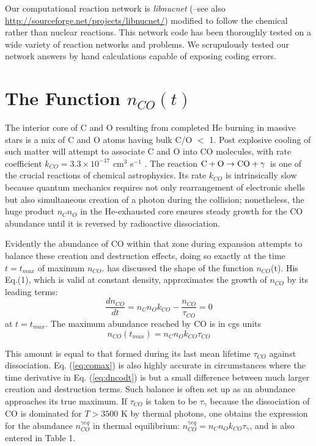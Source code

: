 \documentclass[manuscript]{aastex}
\newcommand{\cotoco}{${\rm C} + {\rm O} \to {\rm CO} + \gamma$}
\begin{document}
Our computational reaction network is {\em libnucnet}
(\citealp{2007M&PSA..42.5215M}--see also
\url{http://sourceforge.net/projects/libnucnet/}) modified to follow
the chemical rather than nuclear reactions.
This network code has been thoroughly tested
on a wide variety of reaction networks and problems.
We scrupulously tested our network answers by hand calculations capable of
exposing coding errors.

\section{The Function $n_{CO}(t)$}

The interior core of C and O resulting from completed He burning in massive
stars is a mix of C and O atoms having bulk C/O $<$ 1. Post explosive cooling of
such matter will attempt to associate C and O into CO molecules, with rate
coefficient $k_{CO} = 3.3 \times 10^{-17}$ cm$^3$ s$^{-1}$
\citep{1990ApJ...358..262L}.
The reaction \cotoco\ is one of the crucial reactions of chemical
astrophysics. Its rate $k_{CO}$ is intrinsically slow because quantum mechanics
requires not only rearrangement of electronic shells but also simultaneous
creation of a photon during the collision; nonetheless, the huge product
$n_C n_O$ in the He-exhausted core ensures steady growth for the CO abundance
until it is reversed by radioactive dissociation. 

Evidently the abundance of CO within that zone during expansion attempts to
balance these creation and destruction effects, doing so exactly at the
time $t = t_{max}$ of maximum $n_{CO}$. \citet{2013ApJ...762....5C}
has discussed the shape of the function
$n_{CO}$(t). His Eq.(1), which is valid at constant density,
approximates the growth of $n_{CO}$ by its leading terms:
\begin{equation}
\frac{dn_{CO}}{dt} = n_C n_O k_{CO} - \frac{n_{CO}}{\tau_{CO}} = 0
\label{eq:dncodt}
\end{equation}
at $t = t_{max}$.
The maximum abundance reached by CO is in cgs units
\begin{equation}
n_{CO}(t_{max}) = n_C n_O k_{CO} \tau_{CO} 
\label{eq:comax}
\end{equation}

This amount is equal to that formed during its last mean lifetime $\tau_{CO}$
against dissociation. Eq. (\ref{eq:comax}) is also highly accurate in
circumstances where the time derivative in Eq. (\ref{eq:dncodt}) is but a
small difference between much larger creation and destruction terms. Such
balance is often set up as an abundance approaches its true maximum. 
If $\tau_{CO}$ is taken to be $\tau_\gamma$ because
the dissociation of CO is dominated for $T > 3500$ K by thermal photons,
one obtains the expression for the abundance $n_{CO}^{\gamma eq}$ in thermal
equilibrium: $n_{CO}^{\gamma eq} = n_C n_O k_{CO} \tau_\gamma$,
and is also entered in Table 1. 
\end{document}
